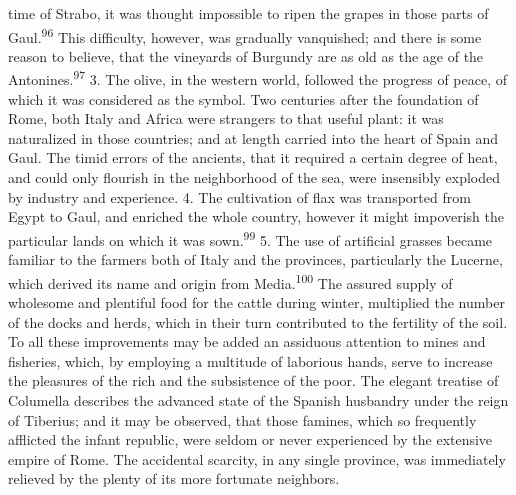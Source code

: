 time of Strabo, it was thought impossible to ripen the grapes in
those parts of Gaul.\textsuperscript{96} This difficulty, however, was gradually
vanquished; and there is some reason to believe, that the
vineyards of Burgundy are as old as the age of the Antonines.\textsuperscript{97}
3. The olive, in the western world, followed the progress of
peace, of which it was considered as the symbol. Two centuries
after the foundation of Rome, both Italy and Africa were
strangers to that useful plant: it was naturalized in those
countries; and at length carried into the heart of Spain and
Gaul. The timid errors of the ancients, that it required a
certain degree of heat, and could only flourish in the
neighborhood of the sea, were insensibly exploded by industry and
experience. 4. The cultivation of flax was transported from Egypt
to Gaul, and enriched the whole country, however it might
impoverish the particular lands on which it was sown.\textsuperscript{99} 5. The
use of artificial grasses became familiar to the farmers both of
Italy and the provinces, particularly the Lucerne, which derived
its name and origin from Media.\textsuperscript{100} The assured supply of
wholesome and plentiful food for the cattle during winter,
multiplied the number of the docks and herds, which in their turn
contributed to the fertility of the soil. To all these
improvements may be added an assiduous attention to mines and
fisheries, which, by employing a multitude of laborious hands,
serve to increase the pleasures of the rich and the subsistence
of the poor. The elegant treatise of Columella describes the
advanced state of the Spanish husbandry under the reign of
Tiberius; and it may be observed, that those famines, which so
frequently afflicted the infant republic, were seldom or never
experienced by the extensive empire of Rome. The accidental
scarcity, in any single province, was immediately relieved by the
plenty of its more fortunate neighbors.




